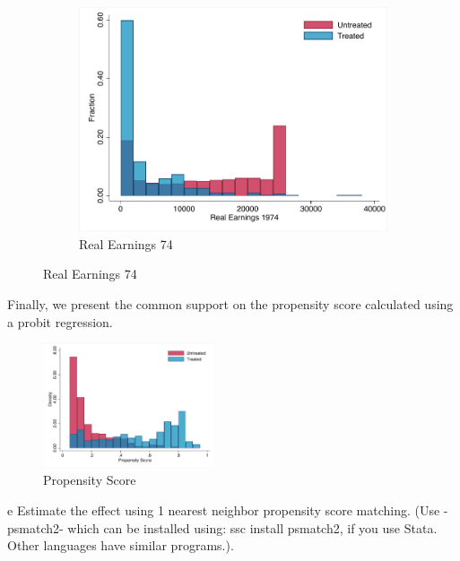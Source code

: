 \documentclass{article}
\begin{document}
\begin{solution}
\begin{figure}[htb]
\begin{subfigure}[b]{0.4\textwidth}
         \includegraphics[width=\textwidth]{ps2/Figures/ps2_q2d_re74.pdf}
         \caption{Real Earnings 74}
         \label{fig:lab_prod}
     \end{subfigure}
\end{figure}

Finally, we present the common support on the propensity score calculated using a probit regression. 
\begin{figure}
    \centering
    \includegraphics[width=0.45\textwidth]{ps2/Figures/ps2_q2d_pscore.pdf}
    \caption{Propensity Score}
\end{figure}
\end{solution}
\FloatBarrier
\begin{problem}{e}
Estimate the effect using 1 nearest neighbor propensity score matching. (Use -psmatch2- which can be installed using: ssc install psmatch2, if you use Stata. Other languages have
similar programs.).
\end{problem}
\end{document}

